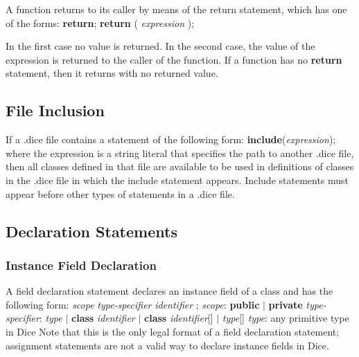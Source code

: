 \begin{homeworkProblem}
	A function returns to its caller by means of the return statement, which has one of the forms:
	\newline
	\newline
	\textbf{return};
	\newline
	\textbf{return} ( \textit{expression} );
	
	In the first case no value is returned. In the second case, the value of the expression is returned to the caller of the function. If a function has no \textbf{return} statement, then it returns with no returned value. 
	
	\subsection{File Inclusion}
	If a .dice file contains a statement of the following form:
	\newline
	\textbf{include}(\textit{expression});
	\newline
	where the expression is a string literal that specifies the path to another .dice file, then all classes defined in that file are available to be used in definitions of classes in the .dice file in which the include statement appears. Include statements must appear before other types of statements in a .dice file.
	
	\subsection{Declaration Statements}
	\subsubsection{Instance Field Declaration}
	A field declaration statement declares an instance field of a class and has the following form:
	\newline
	\textit{scope} \textit{type-specifier} \textit{identifier} ;
	\newline
	\textit{scope}: \textbf{public} $|$ \textbf{private}
	\newline
	\textit{type-specifier}: \textit{type} $|$ \textbf{class} \textit{identifier} $|$ \textbf{class} \textit{identifier}[] $|$ \textit{type}[]
	\newline
	\textit{type}: any primitive type in Dice
	\newline
	Note that this is the only legal format of a field declaration statement; assignment statements are not a valid way to declare instance fields in Dice.
	

\end{homeworkProblem}
